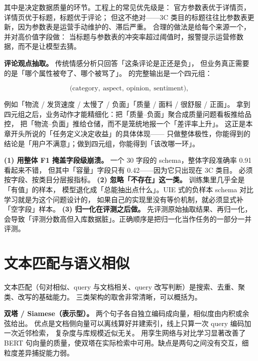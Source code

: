 其中是决定数据质量的环节。工程上的常见优先级是：
官方参数表优于详情页，详情页优于标题，标题优于评论；
但这不绝对——3C 类目的标题往往比参数表更新，因为参数表是运营手动维护的、滞后严重。
合理的做法是给每个来源一个，并对高价值字段做：
当标题与参数表的冲突率超过阈值时，报警提示运营修数据，而不是让模型去猜。

\textbf{评论观点抽取。} 传统情感分析只回答「这条评论是正还是负」，
但业务真正需要的是「哪个属性被夸了、哪个被骂了」。
 的完整输出是一个四元组：

\begin{equation}
\big(\text{category},\ \text{aspect},\ \text{opinion},\ \text{sentiment}\big),
\label{eq:absa}
\end{equation}

例如「物流 / 发货速度 / 太慢了 / 负面」「质量 / 面料 / 很舒服 / 正面」。
拿到四元组之后，业务动作才能精细化：把「质量--负面」聚合成质量问题看板推给品控，
把「物流--负面」推给仓储，而不是笼统地报一个「差评率上升」。
这正是本章开头所说的「任务定义决定收益」的具体体现——
只做整体极性，你能得到的结论是「用户不满意」；做到四元组，你能得到「该改哪一环」。

\begin{pitfall}[属性抽取的三个隐蔽错误]
\textbf{(1) 用整体 F1 掩盖字段级崩溃。} 一个 30 字段的 schema，整体字段准确率 0.91 看起来不错，
但其中「容量」字段只有 0.42——因为它只出现在 3C 类目。
必须按字段、按类目分层报指标。
\textbf{(2) 忽略「不存在」这一类。} 训练集里几乎全是「有值」的样本，
模型退化成「总能抽出点什么」。UIE 式的负样本 schema 对比学习就是为这个问题设计的，
如果自己的实现里没有等价机制，就必须显式补「空字段」样本。
\textbf{(3) 归一化在评测之后做。} 先评测原始抽取结果、再归一化，
会导致「评测分数高但入库数据脏」。正确顺序是把归一化当作任务的一部分一并评测。
\end{pitfall}

\section{文本匹配与语义相似}

文本匹配（句对相似、query 与文档相关、query 改写判断）是搜索、去重、聚类、改写的基础能力。
三类架构的取舍非常清晰，可以概括为。

\textbf{双塔 / Siamese（表示型）。} 两个句子各自独立编码成向量，相似度由内积或余弦给出。
优点是文档侧向量可以离线算好并建索引，线上只算一次 query 编码加一次近邻检索，
复杂度与库规模近似无关。\cite{reimers2019sbert} 用孪生网络与对比学习显著改善了
BERT 句向量的质量，使双塔在实际检索中可用。缺点是两句之间没有交互，细粒度差异捕捉能力弱。

